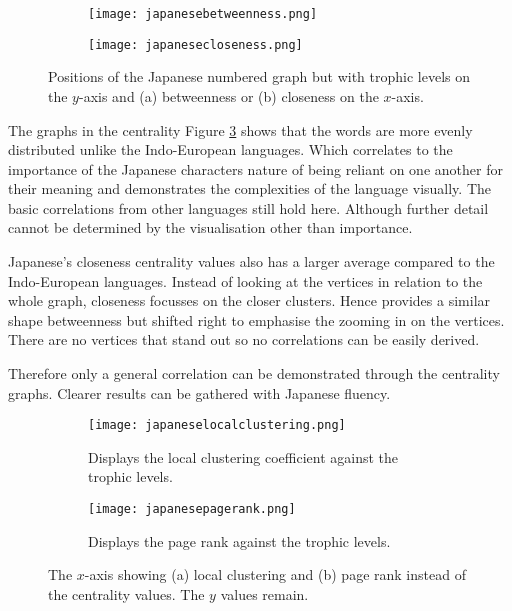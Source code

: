 \begin{figure}[H]
\centering
\begin{subfigure}{.45\textwidth}
	\hspace{-1cm} 
	\texttt{[image: japanesebetweenness.png]}
	\caption{}
	\label{fig:jpbc}
\end{subfigure}
\hfill
\begin{subfigure}{.45\textwidth}
	\hspace{-1cm} 
	\texttt{[image: japanesecloseness.png]}
	\caption{ }
	\label{fig:jpcc}
\end{subfigure}
\caption{Positions of the Japanese numbered graph but with trophic levels on the $y$-axis and (a) betweenness or (b) closeness on the $x$-axis.}
\label{fig:jpcentrality}
\end{figure}

The graphs in the centrality Figure \ref{fig:jpcentrality} shows that the words are more evenly distributed unlike the Indo-European languages. Which correlates to the importance of the Japanese characters nature of being reliant on one another for their meaning and demonstrates the complexities of the language visually. The basic correlations from other languages still hold here. Although further detail cannot be determined by the visualisation other than importance.

Japanese's closeness centrality values also has a larger average compared to the Indo-European languages. Instead of looking at the vertices in relation to the whole graph, closeness focusses on the closer clusters. Hence provides a similar shape betweenness but shifted right to emphasise the zooming in on the vertices. There are no vertices that stand out so no correlations can be easily derived.

Therefore only a general correlation can be demonstrated through the centrality graphs. Clearer results can be gathered with Japanese fluency.

\begin{figure}[H]
\centering
\begin{subfigure}{.45\textwidth}
	\hspace{-1cm} 
	\texttt{[image: japaneselocalclustering.png]}
	\caption{Displays the local clustering coefficient against the trophic levels.}
	\label{fig:jplc}
\end{subfigure}
\hfill
\begin{subfigure}{.45\textwidth}
	\hspace{-1cm} 
	\texttt{[image: japanesepagerank.png]}
	\caption{Displays the page rank against the trophic levels.}
	\label{fig:jppr}
\end{subfigure}
\caption{The $x$-axis showing (a) local clustering and (b) page rank instead of the centrality values. The $y$ values remain.}
\label{fig:jpother}
\end{figure}

